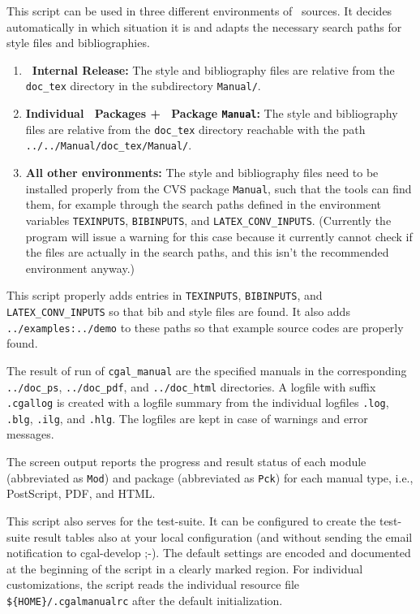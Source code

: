  This script can be used in three different environments of \cgal\ sources.
 It decides automatically in which situation it is and adapts the necessary
 search paths for style files and bibliographies.

\begin{enumerate} 
  \item \textbf{\cgal\ Internal Release:}
     The style and bibliography files are relative from the
     \texttt{doc\_tex} directory  in the subdirectory
     \texttt{Manual/}.
 
  \item \textbf{Individual \cgal\ Packages + \cgal\ Package \texttt{Manual}:}
     The style and bibliography files are  relative from the
     \texttt{doc\_tex} directory reachable with the path
     \texttt{../../Manual/doc\_tex/Manual/}.

   \item \textbf{All other environments:}
     The style and bibliography files need to be installed properly
     from the CVS package \texttt{Manual}, such that the tools can
     find them, for example through the search paths defined in the
     environment variables  \texttt{TEXINPUTS}, \texttt{BIBINPUTS},
     and \texttt{LATEX\_CONV\_INPUTS}. (Currently the program will
     issue a warning for this case because it currently cannot check if
     the files are actually in the search paths, and this isn't the
     recommended environment anyway.)
\end{enumerate}
 
This script properly adds entries in \texttt{TEXINPUTS},
\texttt{BIBINPUTS}, and \texttt{LATEX\_CONV\_INPUTS} so that bib and
style files are found. It also adds \texttt{../examples:../demo} to
these paths so that example source codes are properly found.

The result of run of \texttt{cgal\_manual} are the specified manuals
in the corresponding \texttt{../doc\_ps}, \texttt{../doc\_pdf}, and
\texttt{../doc\_html} directories. A logfile with suffix
\texttt{.cgallog} is created with a logfile summary from the
individual logfiles \texttt{.log}, \texttt{.blg}, \texttt{.ilg}, and
\texttt{.hlg}. The logfiles are kept in case of warnings and error
messages. 

The screen output reports the progress and result status of each
module (abbreviated as \texttt{Mod}) and package (abbreviated as
\texttt{Pck}) for each manual type, i.e., PostScript, PDF, and HTML.

This script also serves for the test-suite. It can be configured to
create the test-suite result tables also at your local configuration
(and without sending the email notification to cgal-develop ;-).
The default settings are encoded and documented at the beginning of
the script in a clearly marked region. For individual customizations,
the script reads the individual resource file
\verb|${HOME}/.cgalmanualrc| after the default initialization.

